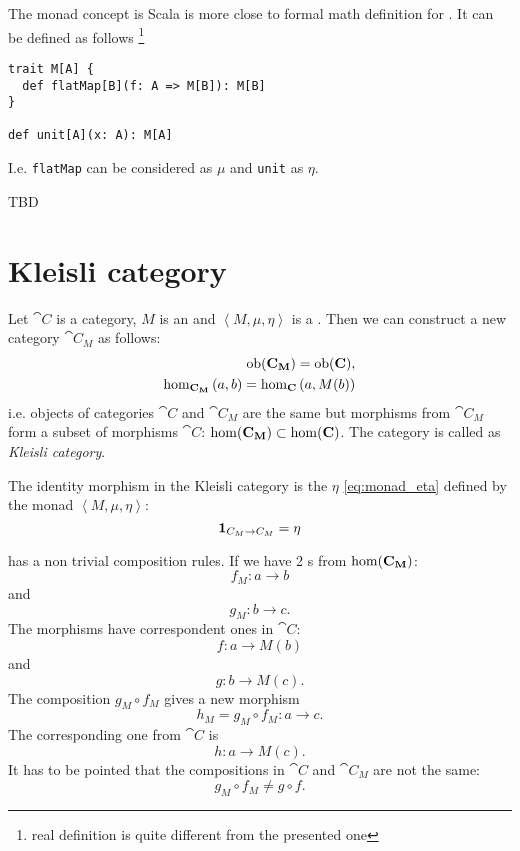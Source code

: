 \begin{example}
The monad concept is Scala is more close to formal math definition for
. It can be defined as follows 
\footnote{real definition is quite different from the presented one}
\label{ex:monad_scala}
\begin{verbatim}
trait M[A] {
  def flatMap[B](f: A => M[B]): M[B]
}
  
def unit[A](x: A): M[A]
\end{verbatim} 
I.e. \texttt{flatMap} can be considered as $\mu$ and
\texttt{unit} as $\eta$. 
\end{example}

TBD

\section{Kleisli category}

\begin{definition}
\label{def:kleisli_category}
Let $\cat{C}$ is a category, $M$ is an  and
$\left<M, \mu, \eta\right>$ is a . Then we can
construct a new category $\cat{C_M}$ as follows:
\begin{eqnarray}
\mathrm{ob}(\mathbf{C_M}) = \mathrm{ob}(\mathbf{C}),
\nonumber \\
\hom_{\mathbf{C_M}}\left(a, b\right) = 
\hom_{\mathbf{C}}\left(a, M(b)\right)
\nonumber
\end{eqnarray}
i.e. objects of categories $\cat{C}$ and $\cat{C_M}$ are the same but
morphisms from $\cat{C_M}$ form a subset of morphisms $\cat{C}$:
$\mathrm{hom}(\mathbf{C_M}) \subset \mathrm{hom}(\mathbf{C})$. The category is called as
\textit{Kleisli category}. 

The identity morphism in the Kleisli category is the
 $\eta$ \eqref{eq:monad_eta} defined by the monad
$\left<M, \mu, \eta\right>$: 
\[
\mathbf{1}_{ C_M \to C_M } = \eta
\]
\end{definition}

\begin{remark}
 has a non trivial composition rules.
If we have 2 s from $\mathrm{hom}(\mathbf{C_M})$:
\[
f_M: a \to b
\]
and
\[
g_M: b \to c.
\]
The morphisms have correspondent ones in $\cat{C}$:
\[
f: a \to M(b)
\]
and
\[
g: b \to M(c).
\]
The composition $g_M \circ f_M$ gives a new morphism
\[
h_M = g_M \circ f_M: a \to c.
\]
The corresponding one from $\cat{C}$ is
\[
h: a \to M(c).
\]
It has to be pointed that the compositions in $\cat{C}$ and
$\cat{C_M}$ are not the same:
\[
g_M \circ f_M \ne g \circ f.
\]
\end{remark}

